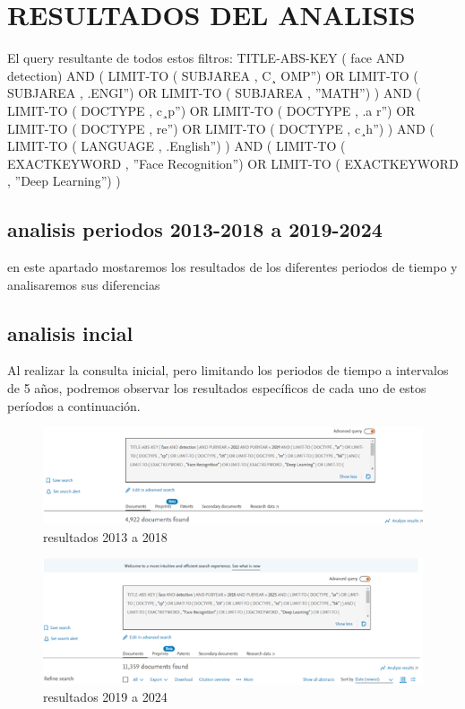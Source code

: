 \documentclass[conference]{IEEEtran}
\begin{document}
\section{RESULTADOS DEL ANALISIS}

El query resultante de todos estos filtros:
TITLE-ABS-KEY ( face AND detection)
AND ( LIMIT-TO ( SUBJAREA , C¸ OMP”) OR LIMIT-TO (
SUBJAREA , .ENGI”) OR LIMIT-TO ( SUBJAREA , ”MATH”)
) AND ( LIMIT-TO ( DOCTYPE , c¸p”) OR LIMIT-TO (
DOCTYPE , .a
r”) OR LIMIT-TO ( DOCTYPE , re”) OR
LIMIT-TO ( DOCTYPE , c¸h”) ) AND ( LIMIT-TO ( LANGUAGE , .English”) ) AND ( LIMIT-TO ( EXACTKEYWORD
, ”Face Recognition”) OR LIMIT-TO ( EXACTKEYWORD ,
”Deep Learning”) )
\subsection{analisis periodos 2013-2018 a 2019-2024}
en este apartado mostaremos los resultados de los diferentes periodos de tiempo y analisaremos sus diferencias

\subsection{analisis incial}
Al realizar la consulta inicial, pero limitando los periodos de tiempo a intervalos de 5 años, podremos observar los resultados específicos de cada uno de estos períodos a continuación.
\begin{figure}[H]
    \centering
    \includegraphics[width=1\linewidth]{resultados 2013.png}
    \caption{resultados 2013 a 2018}
    \label{fig:enter-label}
\end{figure}
\begin{figure}[H]
    \centering
    \includegraphics[width=1\linewidth]{resultados 2019.png}
    \caption{resultados 2019 a 2024}
    \label{fig:enter-label}
\end{figure}
\end{document}
